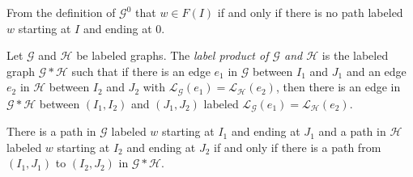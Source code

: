 \documentclass[hidelinks]{article}
\newcommand{\Lc}{\mathcal{L}}  %
\newcommand{\Gc}{\mathcal{G}}  %
\newcommand{\Hc}{\mathcal{H}}  %
\newcommand{\term}[1]{\textit{#1}}
\theoremstyle{definition}
\begin{document}
From the definition of \(\Gc^0\) that \(w \in F(I)\) if and only if 
there is no path labeled \(w\) starting at \(I\) and ending at \(0\).





\begin{definition}
    Let \(\Gc\) and \(\Hc\) be labeled graphs. The \term{label product of \(\Gc\) and \(\Hc\)}
    is the labeled graph \(\Gc * \Hc\) such that if there is an edge \(e_1\) in \(\Gc\)
    between \(I_1\) and \(J_1\) and an edge \(e_2\) in \(\Hc\) between \(I_2\) and \(J_2\)
    with \(\Lc_\Gc(e_1) = \Lc_\Hc(e_2)\), then there is an edge in \(\Gc * \Hc\) between 
    \((I_1, I_2)\) and \((J_1, J_2)\) labeled \(\Lc_\Gc(e_1) = \Lc_\Hc(e_2)\).
\end{definition}

There is a path in \(\Gc\) labeled \(w\) starting at \(I_1\) and ending at \(J_1\)
and a path in \(\Hc\) labeled \(w\) starting at \(I_2\) and ending at \(J_2\) 
if and only if there is a path from \((I_1, J_1)\) to \((I_2, J_2)\) in \(\Gc*\Hc\).
\end{document}
